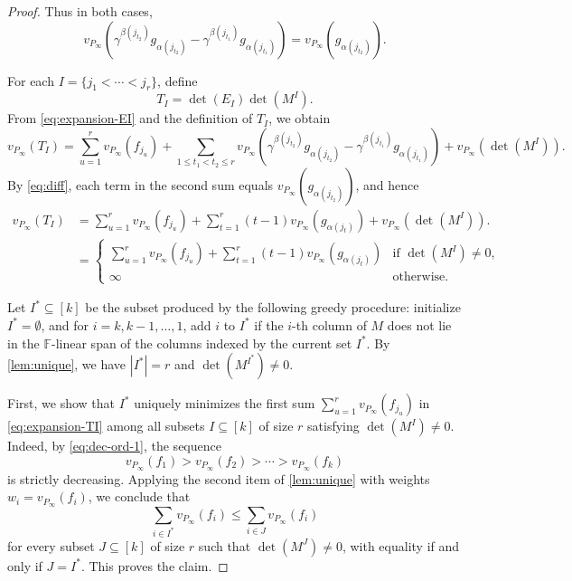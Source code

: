 \documentclass[11pt]{article}
\newcommand{\F}{\mathbb{F}}
\begin{document}
\begin{proof}
\smallskip
Thus in both cases, 
\begin{equation}\label{eq:diff}
v_{P_\infty}\!\left(
\gamma^{\beta(j_{t_2})} g_{\alpha(j_{t_2})}
-
\gamma^{\beta(j_{t_1})} g_{\alpha(j_{t_1})}
\right)
=
v_{P_\infty}(g_{\alpha(j_{t_2})}).
\end{equation}

\medskip
For each $I=\{j_1<\cdots<j_r\}$, define
\[
T_I=\det(E_I)\det(M^I).
\]
From \eqref{eq:expansion-EI} and the definition of $T_I$, we obtain
\[
v_{P_\infty}(T_I)
=
\sum_{u=1}^r v_{P_\infty}(f_{j_u})
+
\sum_{1\le t_1<t_2\le r}
v_{P_\infty}\!\left(
\gamma^{\beta(j_{t_2})} g_{\alpha(j_{t_2})}
-
\gamma^{\beta(j_{t_1})} g_{\alpha(j_{t_1})}
\right)
+
v_{P_\infty}(\det(M^I)).
\]
By \eqref{eq:diff}, each term in the second sum equals
$v_{P_\infty}(g_{\alpha(j_{t_2})})$, and hence
\begin{equation}\label{eq:expansion-TI}
\begin{aligned}
v_{P_\infty}(T_I)
&=
\sum_{u=1}^r v_{P_\infty}(f_{j_u})
+
\sum_{t=1}^r (t-1)v_{P_\infty}(g_{\alpha(j_t)})
+
v_{P_\infty}(\det(M^I)).\\
&=\begin{cases}
\sum_{u=1}^r v_{P_\infty}(f_{j_u})
+
\sum_{t=1}^r (t-1)v_{P_\infty}(g_{\alpha(j_t)}) & \text{if } \det(M^I)\neq 0,\\
\infty & \text{otherwise.}
\end{cases}
\end{aligned}
\end{equation}

Let $I^*\subseteq [k]$ be the subset produced by the following greedy procedure:
initialize $I^*=\emptyset$, and for $i=k,k-1,\dots,1$, add $i$ to $I^*$ if the $i$-th column of $M$ does not lie in the $\F$-linear span of the columns indexed by the current set $I^*$.
By \cref{lem:unique}, we have $|I^*|=r$ and $\det(M^{I^*})\neq 0$.

First, we show that $I^*$ uniquely minimizes
the first sum $\sum_{u=1}^r v_{P_\infty}(f_{j_u})$ in \eqref{eq:expansion-TI}
among all subsets $I\subseteq [k]$ of size $r$ satisfying $\det(M^I)\neq 0$.
Indeed, by \eqref{eq:dec-ord-1}, the sequence
\[
v_{P_\infty}(f_1) > v_{P_\infty}(f_2) > \cdots > v_{P_\infty}(f_k)
\]
is strictly decreasing. Applying the second item of \cref{lem:unique} with weights $w_i = v_{P_\infty}(f_i)$, we conclude that
\[
\sum_{i\in I^*} v_{P_\infty}(f_i)
\le \sum_{i\in J} v_{P_\infty}(f_i)
\]
for every subset $J\subseteq [k]$ of size $r$ such that $\det(M^J)\neq 0$, with equality if and only if $J=I^*$. This proves the claim.
 


\end{proof}
\end{document}

